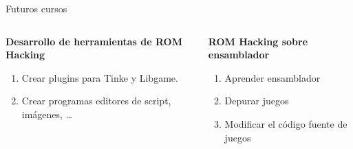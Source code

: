 \begin{frame}{Futuros cursos}
    \begin{columns}
    \begin{column}{0.5\textwidth}
        \textbf{Desarrollo de herramientas de ROM Hacking}
        \begin{enumerate}
            \item Crear plugins para Tinke y Libgame.
            \item Crear programas editores de script, imágenes, \ldots
        \end{enumerate}
    \end{column}
    \hfill
    \begin{column}{0.5\textwidth}
        \textbf{ROM Hacking sobre ensamblador}
        \begin{enumerate}
            \item Aprender ensamblador
            \item Depurar juegos
            \item Modificar el código fuente de juegos
        \end{enumerate}
    \end{column}
    \end{columns}

\end{frame}
